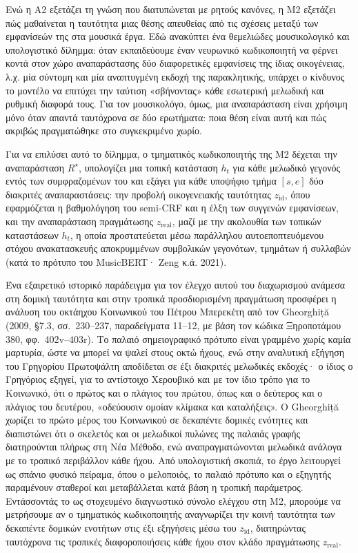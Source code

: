 \documentclass[11pt,a4paper]{article}
\newcommand{\Rs}{R^{\star}}
\begin{document}
Ενώ η Α2 εξετάζει τη γνώση που διατυπώνεται με ρητούς κανόνες, η Μ2 εξετάζει πώς μαθαίνεται η ταυτότητα μιας θέσης απευθείας από τις σχέσεις μεταξύ των εμφανίσεών της στα μουσικά έργα. Εδώ ανακύπτει ένα θεμελιώδες μουσικολογικό και υπολογιστικό δίλημμα: όταν εκπαιδεύουμε έναν νευρωνικό κωδικοποιητή να φέρνει κοντά στον χώρο αναπαράστασης δύο διαφορετικές εμφανίσεις της ίδιας οικογένειας, λ.χ. μία σύντομη και μία αναπτυγμένη εκδοχή της παρακλητικής, υπάρχει ο κίνδυνος το μοντέλο να επιτύχει την ταύτιση «σβήνοντας» κάθε εσωτερική μελωδική και ρυθμική διαφορά τους. Για τον μουσικολόγο, όμως, μια αναπαράσταση είναι χρήσιμη μόνο όταν απαντά ταυτόχρονα σε δύο ερωτήματα: ποια θέση είναι αυτή και πώς ακριβώς πραγματώθηκε στο συγκεκριμένο χωρίο.

Για να επιλύσει αυτό το δίλημμα, ο τμηματικός κωδικοποιητής της Μ2 δέχεται την αναπαράσταση $\Rs$, υπολογίζει μια τοπική κατάσταση $h_t$ για κάθε μελωδικό γεγονός εντός των συμφραζομένων του και εξάγει για κάθε υποψήφιο τμήμα $[s,e]$ δύο διακριτές αναπαραστάσεις: την προβολή οικογενειακής ταυτότητας $z_{\text{id}}$, όπου εφαρμόζεται η βαθμολόγηση του semi-CRF και η έλξη των συγγενών εμφανίσεων, και την αναπαράσταση πραγμάτωσης $z_{\text{real}}$, μαζί με την ακολουθία των τοπικών καταστάσεων $h_t$, η οποία προστατεύεται μέσω παράλληλου αυτοεποπτευόμενου στόχου ανακατασκευής αποκρυμμένων συμβολικών γεγονότων, τμημάτων ή συλλαβών (κατά το πρότυπο του MusicBERT· Zeng κ.ά. 2021).

Ένα εξαιρετικό ιστορικό παράδειγμα για τον έλεγχο αυτού του διαχωρισμού ανάμεσα στη δομική ταυτότητα και στην τροπικά προσδιορισμένη πραγμάτωση προσφέρει η ανάλυση του οκτάηχου Κοινωνικού του Πέτρου Μπερεκέτη από τον Gheorghiță (2009, §7.3, σσ.~230--237, παραδείγματα 11--12, με βάση τον κώδικα Ξηροποτάμου 380, φφ.~402v--403r). Το παλαιό σημειογραφικό πρότυπο είναι γραμμένο χωρίς καμία μαρτυρία, ώστε να μπορεί να ψαλεί στους οκτώ ήχους, ενώ στην αναλυτική εξήγηση του Γρηγορίου Πρωτοψάλτη αποδίδεται σε έξι διακριτές μελωδικές εκδοχές· ο ίδιος ο Γρηγόριος εξηγεί, για το αντίστοιχο Χερουβικό και με τον ίδιο τρόπο για το Κοινωνικό, ότι ο πρώτος και ο πλάγιος του πρώτου, όπως και ο δεύτερος και ο πλάγιος του δευτέρου, «οδεύουσιν ομοίαν κλίμακα και καταλήξεις». Ο Gheorghiță χωρίζει το πρώτο μέρος του Κοινωνικού σε δεκαπέντε δομικές ενότητες και διαπιστώνει ότι ο σκελετός και οι μελωδικοί πυλώνες της παλαιάς γραφής διατηρούνται πλήρως στη Νέα Μέθοδο, ενώ αναπραγματώνονται μελωδικά ανάλογα με το τροπικό περιβάλλον κάθε ήχου. Από υπολογιστική σκοπιά, το έργο λειτουργεί ως σπάνιο φυσικό πείραμα, όπου ο μελοποιός, το παλαιό πρότυπο και ο εξηγητής παραμένουν σταθεροί και μεταβάλλεται κατά βάση η τροπική παράμετρος. Εντάσσοντάς το ως στοχευμένο διαγνωστικό σύνολο ελέγχου στη Μ2, μπορούμε να μετρήσουμε αν ο τμηματικός κωδικοποιητής αναγνωρίζει την κοινή ταυτότητα των δεκαπέντε δομικών ενοτήτων στις έξι εξηγήσεις μέσω του $z_{\text{id}}$, διατηρώντας ταυτόχρονα τις τροπικές διαφοροποιήσεις κάθε ήχου στον κλάδο πραγμάτωσης $z_{\text{real}}$.
\end{document}
